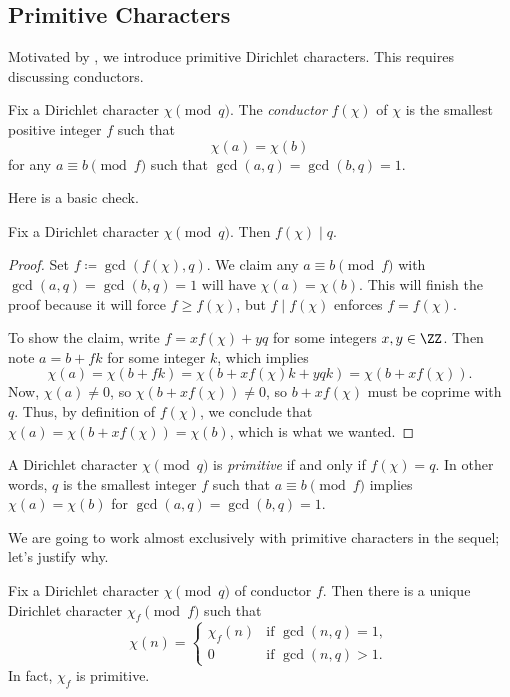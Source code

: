 \documentclass[../notes.tex]{subfiles}
\begin{document}
\subsection{Primitive Characters}
Motivated by , we introduce primitive Dirichlet characters. This requires discussing conductors.
\begin{definition}[conductor]
	Fix a Dirichlet character $\chi\pmod q$. The \textit{conductor} $f(\chi)$ of $\chi$ is the smallest positive integer $f$ such that
	\[\chi(a)=\chi(b)\]
	for any $a\equiv b\pmod f$ such that $\gcd(a,q)=\gcd(b,q)=1$.
\end{definition}
Here is a basic check.
\begin{lemma} \label{lem:conductor-divides-modulus}
	Fix a Dirichlet character $\chi\pmod q$. Then $f(\chi)\mid q$.
\end{lemma}
\begin{proof}
	Set $f\coloneqq\gcd(f(\chi),q)$. We claim any $a\equiv b\pmod f$ with $\gcd(a,q)=\gcd(b,q)=1$ will have $\chi(a)=\chi(b)$. This will finish the proof because it will force $f\ge f(\chi)$, but $f\mid f(\chi)$ enforces $f=f(\chi)$.
	
	To show the claim, write $f=xf(\chi)+yq$ for some integers $x,y\in\ZZ$. Then note $a=b+fk$ for some integer $k$, which implies
	\[\chi(a)=\chi(b+fk)=\chi(b+xf(\chi)k+yqk)=\chi(b+xf(\chi)).\]
	Now, $\chi(a)\ne0$, so $\chi(b+xf(\chi))\ne0$, so $b+xf(\chi)$ must be coprime with $q$. Thus, by definition of $f(\chi)$, we conclude that $\chi(a)=\chi(b+xf(\chi))=\chi(b)$, which is what we wanted.
\end{proof}
\begin{definition}[primitive]
	A Dirichlet character $\chi\pmod q$ is \textit{primitive} if and only if $f(\chi)=q$. In other words, $q$ is the smallest integer $f$ such that $a\equiv b\pmod f$ implies $\chi(a)=\chi(b)$ for $\gcd(a,q)=\gcd(b,q)=1$.
\end{definition}
We are going to work almost exclusively with primitive characters in the sequel; let's justify why.
\begin{proposition} \label{prop:all-chars-induced-from-primitive}
	Fix a Dirichlet character $\chi\pmod q$ of conductor $f$. Then there is a unique Dirichlet character $\chi_f\pmod f$ such that
	\[\chi(n)=\begin{cases}
		\chi_f(n) & \text{if }\gcd(n,q)=1, \\
		0 & \text{if }\gcd(n,q)>1.
	\end{cases}\]
	In fact, $\chi_f$ is primitive.
\end{proposition}
\end{document}
